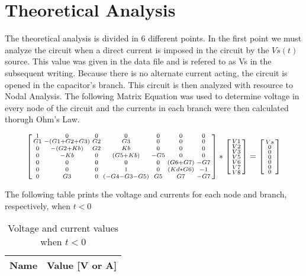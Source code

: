 \section{Theoretical Analysis}
\label{sec:analysis}
The theoretical analysis is divided in 6 different points.
In the first point we must analyze the circuit when a direct current is imposed in the circuit by the $Vs(t)$ source. This value was given in the data file and is refered to as Vs in the subsequent writing. Because there is no alternate current acting, the circuit is opened in the capacitor's branch. This circuit is then analyzed with resource to Nodal Analysis. The following Matrix Equation was used to determine voltage in every node of the circuit and the currents in each branch were then calculated thorugh Ohm's Law.

\begin{equation}
\begin{bsmallmatrix}
1  & 0  & 0  & 0  & 0  & 0  & 0\\
G1  & -(G1 + G2 + G3)  & G2  & G3  & 0  & 0  & 0\\
0  & -(G2 + Kb)  & G2  & Kb  & 0  & 0  & 0\\
0  & -Kb  & 0  & (G5 + Kb)  & -G5  & 0  & 0\\
0  & 0  & 0  & 0  & 0  & (G6 + G7)  & -G7\\
0  & 0  & 0  & 1  & 0  & (Kd * G6)  & -1\\
0  & G3  & 0  & (-G4 - G3 - G5)  & G5  & G7  & -G7
\end{bsmallmatrix}
*
\begin{bsmallmatrix}
V1\\
V2\\
V3\\
V5\\
V6\\
V7\\
V8
\end{bsmallmatrix}
=
\begin{bsmallmatrix}
Vs\\
0\\
0\\
0\\
0\\
0\\
0
\end{bsmallmatrix}
\end{equation}
\par
\par
The following table prints the voltage and currents for each node and branch, respectively, when $t<0$
\par
\par
\begin{table}[H]
  \centering
  \begin{tabular}{|l|r|}
    \hline    
    {\bf Name} & {\bf Value [V or A]} \\ \hline
    
  \end{tabular}
  \caption{Voltage and current values when $t<0$}
  \label{tab:tcamp}
\end{table}
\vspace{20pt}


